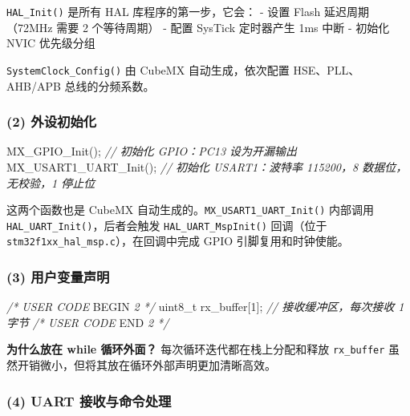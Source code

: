 \documentclass[
  chinese,
  UTF8,
  oneside,
  openany]{ctexbook}
\newenvironment{Shaded}{}{}
\newcommand{\CommentTok}[1]{\textcolor[rgb]{0.38,0.63,0.69}{\textit{#1}}}
\newcommand{\DataTypeTok}[1]{\textcolor[rgb]{0.56,0.13,0.00}{#1}}
\newcommand{\DecValTok}[1]{\textcolor[rgb]{0.25,0.63,0.44}{#1}}
\newcommand{\NormalTok}[1]{#1}
\newcommand{\OperatorTok}[1]{\textcolor[rgb]{0.40,0.40,0.40}{#1}}
\newcommand{\RegionMarkerTok}[1]{#1}
\begin{document}
\texttt{HAL\_Init()} 是所有 HAL 库程序的第一步，它会： - 设置 Flash
延迟周期（72MHz 需要 2 个等待周期） - 配置 SysTick 定时器产生 1ms 中断 -
初始化 NVIC 优先级分组

\texttt{SystemClock\_Config()} 由 CubeMX 自动生成，依次配置
HSE、PLL、AHB/APB 总线的分频系数。

\subsubsection{(2) 外设初始化}\label{ux5916ux8bbeux521dux59cbux5316}

\begin{Shaded}
\begin{Highlighting}[]
\NormalTok{MX\_GPIO\_Init}\OperatorTok{();}          \CommentTok{// 初始化 GPIO：PC13 设为开漏输出}
\NormalTok{MX\_USART1\_UART\_Init}\OperatorTok{();}   \CommentTok{// 初始化 USART1：波特率 115200，8 数据位，无校验，1 停止位}
\end{Highlighting}
\end{Shaded}

这两个函数也是 CubeMX 自动生成的。\texttt{MX\_USART1\_UART\_Init()}
内部调用 \texttt{HAL\_UART\_Init()}，后者会触发
\texttt{HAL\_UART\_MspInit()} 回调（位于
\texttt{stm32f1xx\_hal\_msp.c}），在回调中完成 GPIO 引脚复用和时钟使能。

\subsubsection{(3)
用户变量声明}\label{ux7528ux6237ux53d8ux91cfux58f0ux660e}

\begin{Shaded}
\begin{Highlighting}[]
\CommentTok{/* USER CODE }\RegionMarkerTok{BEGIN}\CommentTok{ 2 */}
\DataTypeTok{uint8\_t}\NormalTok{ rx\_buffer}\OperatorTok{[}\DecValTok{1}\OperatorTok{];}  \CommentTok{// 接收缓冲区，每次接收 1 字节}
\CommentTok{/* USER CODE }\RegionMarkerTok{END}\CommentTok{ 2 */}
\end{Highlighting}
\end{Shaded}

\textbf{为什么放在 while 循环外面？} 每次循环迭代都在栈上分配和释放
\texttt{rx\_buffer} 虽然开销微小，但将其放在循环外部声明更加清晰高效。

\subsubsection{(4) UART
接收与命令处理}\label{uart-ux63a5ux6536ux4e0eux547dux4ee4ux5904ux7406}
\end{document}
